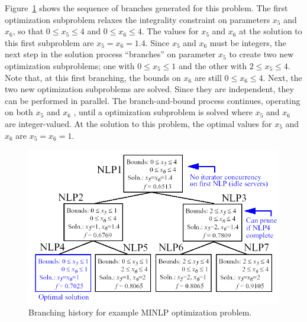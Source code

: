 
Figure~\ref{adv_meth:figure07} shows the sequence of branches generated
for this problem.  The first optimization subproblem relaxes the
integrality constraint on parameters $x_{5}$ and $x_{6}$, so that $0
\leq x_{5} \leq 4$ and $0 \leq x_{6} \leq 4$. The values for $x_{5}$
and $x_{6}$ at the solution to this first subproblem are
$x_{5}=x_{6}=1.4$.  Since $x_{5}$ and $x_{6}$ must be integers, the
next step in the solution process ``branches'' on parameter $x_{5}$ to
create two new optimization subproblems; one with $0 \leq x_{5} \leq
1$ and the other with $2 \leq x_{5} \leq 4$.  Note that, at this first
branching, the bounds on $x_{6}$ are still $0 \leq x_{6} \leq 4$.
Next, the two new optimization subproblems are solved.  Since they are
independent, they can be performed in parallel.  The branch-and-bound
process continues, operating on both $x_{5}$ and $x_{6}$ , until a
optimization subproblem is solved where $x_{5}$ and $x_{6}$ are
integer-valued. At the solution to this problem, the optimal values
for $x_{5}$ and $x_{6}$ are $x_{5}=x_{6}=1$.

\begin{figure}
  \centering
  \includegraphics[scale=0.75]{images/branch_history}
  \caption{Branching history for example MINLP optimization problem.}
  \label{adv_meth:figure07}
\end{figure}

